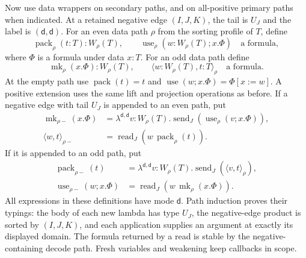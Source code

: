 Now use data wrappers on secondary paths, and on all-positive primary
paths when indicated.  At a retained negative edge $(I,J,K)$, the tail is
$U_J$ and the label is $(\mathsf d,\mathsf d)$.  For an even data path
$\rho$ from the sorting profile of $T$, define
\[
 \operatorname{pack}_\rho(t:T):W_\rho(T),\qquad
 \operatorname{use}_\rho(w:W_\rho(T);x.\Phi)\quad\text{a formula},
\]
where $\Phi$ is a formula under data $x:T$.  For an odd data path define
\[
 \operatorname{mk}_\rho(x.\Phi):W_\rho(T),\qquad
 \langle w:W_\rho(T),t:T\rangle_\rho\quad\text{a formula}.
\]
At the empty path use $\operatorname{pack}(t)=t$ and
$\operatorname{use}(w;x.\Phi)=\Phi[x:=w]$.
A positive extension uses the same lift and projection operations as
before.  If a negative edge with tail $U_J$ is appended to an even path,
put
\begin{align*}
 \operatorname{mk}_{\rho-}(x.\Phi)
   &=\lambda^{\mathsf d,\mathsf d}v:W_\rho(T).
           \operatorname{send}_J(\operatorname{use}_\rho(v;x.\Phi)),\\
 \langle w,t\rangle_{\rho-}
   &=\operatorname{read}_J(w\,\operatorname{pack}_\rho(t)).
\end{align*}
If it is appended to an odd path, put
\begin{align*}
 \operatorname{pack}_{\rho-}(t)
   &=\lambda^{\mathsf d,\mathsf d}v:W_\rho(T).
                         \operatorname{send}_J(\langle v,t\rangle_\rho),\\
 \operatorname{use}_{\rho-}(w;x.\Phi)
   &=\operatorname{read}_J(w\,\operatorname{mk}_\rho(x.\Phi)).
\end{align*}
All expressions in these definitions have mode $\mathsf d$.
Path induction proves their typings: the body of each new lambda has type
$U_J$, the negative-edge product is sorted by $(I,J,K)$, and each
application supplies an argument at exactly its displayed domain.  The
formula returned by a read is stable by the negative-containing decode
path.  Fresh variables and weakening keep callbacks in scope.

